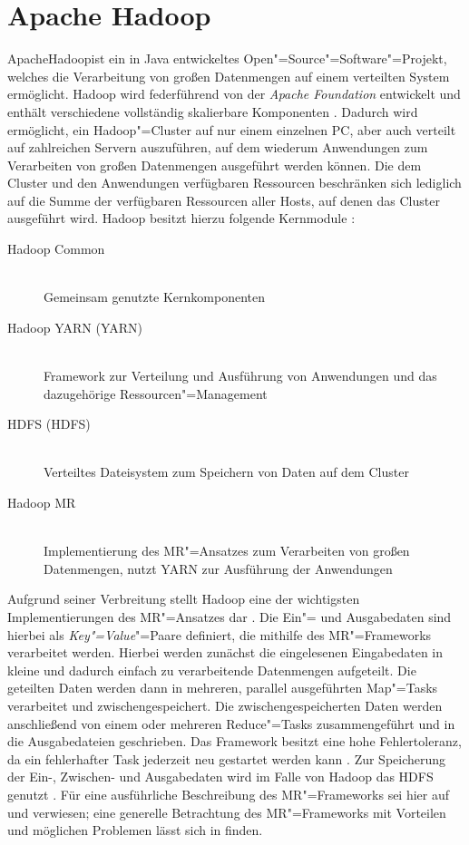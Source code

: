 \section{Apache Hadoop}
\label{sec:hadoop}

Apache\texttrademark Hadoop\textregistered ist ein in Java entwickeltes Open"=Source"=Software"=Projekt, welches die Verarbeitung von großen Datenmengen auf einem verteilten System ermöglicht.
Hadoop wird federführend von der \emph{Apache Foundation} entwickelt und enthält verschiedene vollständig skalierbare Komponenten \cite{HadoopHomePage}.
Dadurch wird ermöglicht, ein Hadoop"=Cluster auf nur einem einzelnen PC, aber auch verteilt auf zahlreichen Servern auszuführen, auf dem wiederum Anwendungen zum Verarbeiten von großen Datenmengen ausgeführt werden können.
Die dem Cluster und den Anwendungen verfügbaren Ressourcen beschränken sich lediglich auf die Summe der verfügbaren Ressourcen aller Hosts, auf denen das Cluster ausgeführt wird.
Hadoop besitzt hierzu folgende Kernmodule \cite{HadoopHomePage}:

\begin{description}
	\item[Hadoop Common] \hfill \\
        Gemeinsam genutzte Kernkomponenten
	\item[Hadoop \acrshort{YARN} (\acrlong{YARN})] \hfill \\
        Framework zur Verteilung und Ausführung von Anwendungen und das dazugehörige Ressourcen"=Management
	\item[\acrlong{HDFS} (\acrshort{HDFS})] \hfill \\
        Verteiltes Dateisystem zum Speichern von Daten auf dem Cluster
	\item[Hadoop \gls{MR}] \hfill \\
        Implementierung des \gls{MR}"=Ansatzes zum Verarbeiten von großen Datenmengen, nutzt YARN zur Ausführung der Anwendungen
\end{description}

Aufgrund seiner Verbreitung stellt Hadoop eine der wichtigsten Implementierungen des \gls{MR}"=Ansatzes dar \cite{PoweredByHadoop}.
Die Ein"= und Ausgabedaten sind hierbei als \emph{Key"=Value}"=Paare definiert, die mithilfe des \gls{MR}"=Frameworks verarbeitet werden.
Hierbei werden zunächst die eingelesenen Eingabedaten in kleine und dadurch einfach zu verarbeitende Datenmengen aufgeteilt.
Die geteilten Daten werden dann in mehreren, parallel ausgeführten Map"=Tasks verarbeitet und zwischengespeichert.
Die zwischengespeicherten Daten werden anschließend von einem oder mehreren Reduce"=Tasks zusammengeführt und in die Ausgabedateien geschrieben.
Das Framework besitzt eine hohe Fehlertoleranz, da ein fehlerhafter Task jederzeit neu gestartet werden kann \cite{Dean2004,Dean2010}.
Zur Speicherung der Ein-, Zwischen- und Ausgabedaten wird im Falle von Hadoop das HDFS genutzt \cite{HadoopMapRedTutorial271}.
Für eine ausführliche Beschreibung des \gls{MR}"=Frameworks sei hier auf \cite{Dean2004} und \cite{Dean2010} verwiesen; eine generelle Betrachtung des \gls{MR}"=Frameworks mit Vorteilen und möglichen Problemen lässt sich in \cite{Lee2012} finden.

